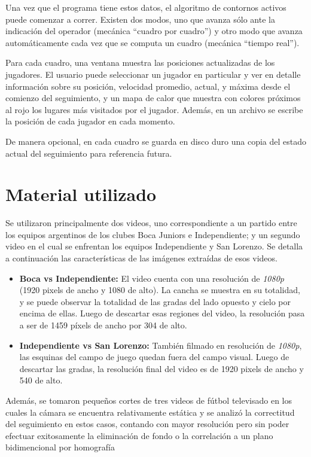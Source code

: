 Una vez que el programa tiene estos datos, el algoritmo de contornos activos puede comenzar a correr. Existen dos modos, uno que avanza sólo ante la indicación del operador (mecánica ``cuadro por cuadro'') y otro modo que avanza automáticamente cada vez que se computa un cuadro (mecánica ``tiempo real'').  %

Para cada cuadro, una ventana muestra las posiciones actualizadas de los jugadores. El usuario puede seleccionar un jugador en particular y ver en detalle información sobre su posición, velocidad promedio, actual, y máxima desde el comienzo del seguimiento, y un mapa de calor que muestra con colores próximos al rojo los lugares más visitados por el jugador. Además, en un archivo se escribe la posición de cada jugador en cada momento.

De manera opcional, en cada cuadro se guarda en disco duro una copia del estado actual del seguimiento para referencia futura.

\section{Material utilizado}

Se utilizaron principalmente dos videos, uno correspondiente a un partido entre los equipos argentinos de los clubes Boca Juniors e Independiente; y un segundo video en el cual se enfrentan los equipos Independiente y San Lorenzo. Se detalla a continuación las características de las imágenes extraídas de esos videos.

\begin{itemize}
  \item \textbf{Boca vs Independiente:} El video cuenta con una resolución de \textit{1080p} (1920 pixels de ancho y 1080 de alto). La cancha se muestra en su totalidad, y se puede observar la totalidad de las gradas del lado opuesto y cielo por encima de ellas. Luego de descartar esas regiones del video, la resolución pasa a ser de 1459 píxels de ancho por 304 de alto. %
  \item \textbf{Independiente vs San Lorenzo:} También filmado en resolución de \textit{1080p}, las esquinas del campo de juego quedan fuera del campo visual. Luego de descartar las gradas, la resolución final del video es de 1920 pixels de ancho y 540 de alto. %
\end{itemize}

Además, se tomaron pequeños cortes de tres videos de fútbol televisado en los cuales la cámara se encuentra relativamente estática y se analizó la correctitud del seguimiento en estos casos, contando con mayor resolución pero sin poder efectuar exitosamente la eliminación de fondo o la correlación a un plano bidimencional por homografía %

